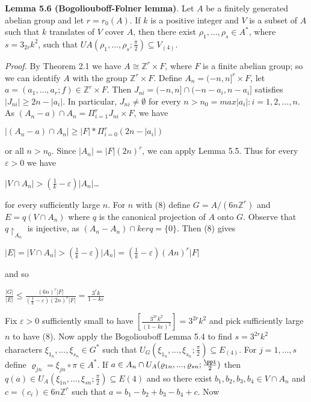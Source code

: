 \documentclass[12pt]{article}
\begin{document}
\textbf{Lemma 5.6 (Bogoliouboff-Folner lemma)}. Let $A$ be a finitely generated abelian group and let $r = r_0 (A)$. If
$k$ is a positive integer and $V$ is a subset of $A$ such that $k$ translates of $V$ cover $A$, then there exist $\rho_1, . . . , \rho_s \in A^*$,
where $s = 3_{2r}k^2$, such that $UA(\rho_1, . . . , \rho_s; \frac{\pi}{2}) \subseteq V_{(4)}$.


\emph{Proof.} By Theorem 2.1 we have $A \cong \mathbb{Z}^r \times F$, where $F$ is a finite abelian group; so we can identify $A$ with the
group $\mathbb{Z}^r \times F$. Define $A_n = (-n, n]^r \times F$, let $a = (a_1, . . . , a_r; f) \in \mathbb{Z}^r \times F$. Then $J_{ni} = (-n, n] \cap (-n-a_i, n-a_i]$
satisfies $|J_{ni}| \geq 2n - |a_i|$. In particular, $J_{ni} \neq ∅$ for every $n > n_0 = max{|a_i| : i = 1, 2, . . . , n}$. As
$(A_n-a) \cap A_n = \Pi^r_{i=1} J_{ni} \times F$, we have


    $|(A_n - a)\cap A_n| \geq |F| * \Pi^r_{i=0} (2n - |a_i|)$

or all $n > n_0$. Since $|A_n| = |F|(2n)^r$, we can apply Lemma 5.5. Thus for every $\varepsilon > 0$ we have


    $|V \cap A_n| > (\frac{1}{k} - \varepsilon) |A_n|$\dots


for every sufficiently large $n$. For $n$ with (8) define $G = A/(6n\mathbb{Z}^r)$ and $E = q(V \cap A_n)$ where $q$ is the canonical
projection of $A$ onto $G$. Observe that $q \upharpoonright_{A_n}$ is injective, as $(A_n - A_n) \cap ker q = \{0\}$. Then (8) gives


    $|E| = |V \cap A_n| > (\frac{1}{k} - \varepsilon) |A_n| = (\frac{1}{k} - \varepsilon) (An)^r |F|$


and so 


    $\frac{|G|}{|E|} \leq \frac{(6n)^r |F|}{(\frac{1}{k} - \varepsilon) (2n)^r |F|} = \frac{3^r k}{1 - k \varepsilon}$


Fix $\varepsilon > 0$ sufficiently small to have $[\frac{3^{2r}k^2}{(1-k \varepsilon)^2}] = 3^{2r}k^2$ and pick sufficiently large $n$ to have (8). Now apply the
Bogoliouboff Lemma 5.4 to find $s = 3^{2r}k^2$ characters $\xi_{1_n}, . . . , \xi_{s_n} \in G^*$ such that $U_G(\xi_{1_n}, . . . , \xi_{s_n}; \frac{\pi}{2}) \subseteq E_{(4)}$.
For $j = 1, . . . , s$ define $\varrho_{jn} = \xi_{jn} \circ \pi \in A^*$. If $a \in A_n \cap U_A(\varrho_{1n}, . . . , \varrho_{sn}; \frac{\ppi}{2})$ then $q(a) \in U_A(\xi_{1n}, . . . , \xi_{sn};\frac{\pi}{2}) \subseteq E(4)$
and so there exist $b_1, b_2, b_3, b_4 \in V \cap A_n$ and $c = (c_i) \in 6n \mathbb{Z}^r$ such that $a = b_1 - b_2 + b_3 - b_4 + c$. Now
\end{document}
